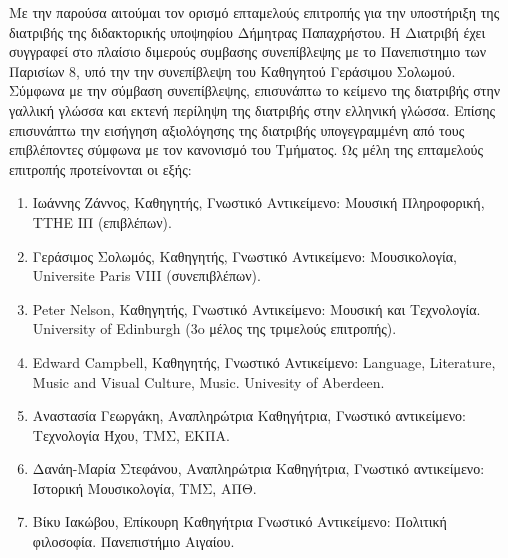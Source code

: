\noindent
\noindent
Με την παρούσα αιτούμαι τον ορισμό επταμελούς επιτροπής για την υποστήριξη της διατριβής της διδακτορικής υποψηφίου Δήμητρας Παπαχρήστου.  Η Διατριβή έχει συγγραφεί στο πλαίσιο διμερούς συμβασης συνεπίβλεψης με το Πανεπιστημιο των Παρισίων 8, υπό την την συνεπίβλεψη του Καθηγητού Γεράσιμου Σολωμού.  Σύμφωνα με την σύμβαση συνεπίβλεψης, επισυνάπτω το κείμενο της διατριβής στην γαλλική γλώσσα και εκτενή περίληψη της διατριβής στην ελληνική γλώσσα.  Επίσης επισυνάπτω την εισήγηση αξιολόγησης της διατριβής υπογεγραμμένη από τους επιβλέποντες σύμφωνα με τον κανονισμό του Τμήματος.  Ως μέλη της επταμελούς επιτροπής προτείνονται οι εξής:

\begin{enumerate}
\item Ιωάννης Ζάννος, Καθηγητής, Γνωστικό Αντικείμενο: Μουσική Πληροφορική, ΤΤΗΕ ΙΠ (επιβλέπων).
\item Γεράσιμος Σολωμός, Καθηγητής, Γνωστικό Αντικείμενο: Μουσικολογία, Universite Paris VIII (συνεπιβλέπων).
\item Peter Nelson, Καθηγητής, Γνωστικό Αντικείμενο: Μουσική και Τεχνολογία. University of Edinburgh (3o μέλος της τριμελούς επιτροπής).
\item Edward Campbell, Καθηγητής, Γνωστικό Αντικείμενο: Language, Literature, Music and Visual Culture, Music. Univesity of Aberdeen.
\item Αναστασία Γεωργάκη, Αναπληρώτρια Καθηγήτρια, Γνωστικό αντικείμενο: Τεχνολογία Ήχου, ΤΜΣ, ΕΚΠΑ.
\item Δανάη-Μαρία Στεφάνου, Αναπληρώτρια Καθηγήτρια,  Γνωστικό αντικείμενο: Ιστορική Μουσικολογία, ΤΜΣ, ΑΠΘ.
\item Βίκυ Ιακώβου, Επίκουρη Kαθηγήτρια Γνωστικό Αντικείμενο: Πολιτική φιλοσοφία. Πανεπιστήμιο Αιγαίου.
\end{enumerate}
